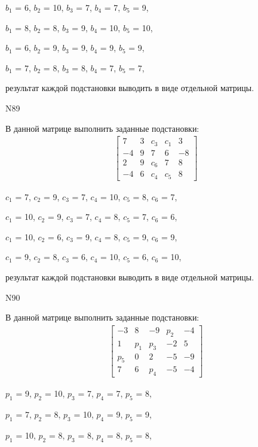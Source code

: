 \documentclass[11pt]{report}
\begin{document}
$b_{1}$ = 6, $b_{2}$ = 10, $b_{3}$ = 7, $b_{4}$ = 7, $b_{5}$ = 9, 

$b_{1}$ = 8, $b_{2}$ = 8, $b_{3}$ = 9, $b_{4}$ = 10, $b_{5}$ = 10, 

$b_{1}$ = 6, $b_{2}$ = 9, $b_{3}$ = 9, $b_{4}$ = 9, $b_{5}$ = 9, 

$b_{1}$ = 7, $b_{2}$ = 8, $b_{3}$ = 8, $b_{4}$ = 7, $b_{5}$ = 7, 

результат каждой подстановки выводить в виде отдельной матрицы.

N89

В данной матрице выполнить заданные подстановки:
\begin{align*}
\left[\begin{matrix}7 & 3 & c_{3} & c_{1} & 3\\-4 & 9 & 7 & 6 & -8\\2 & 9 & c_{6} & 7 & 8\\-4 & 6 & c_{4} & c_{5} & 8\end{matrix}\right]
\end{align*}


$c_{1}$ = 7, $c_{2}$ = 9, $c_{3}$ = 7, $c_{4}$ = 10, $c_{5}$ = 8, $c_{6}$ = 7, 

$c_{1}$ = 10, $c_{2}$ = 9, $c_{3}$ = 7, $c_{4}$ = 8, $c_{5}$ = 7, $c_{6}$ = 6, 

$c_{1}$ = 10, $c_{2}$ = 6, $c_{3}$ = 9, $c_{4}$ = 8, $c_{5}$ = 9, $c_{6}$ = 9, 

$c_{1}$ = 9, $c_{2}$ = 8, $c_{3}$ = 6, $c_{4}$ = 10, $c_{5}$ = 6, $c_{6}$ = 10, 

результат каждой подстановки выводить в виде отдельной матрицы.

N90

В данной матрице выполнить заданные подстановки:
\begin{align*}
\left[\begin{matrix}-3 & 8 & -9 & p_{2} & -4\\1 & p_{1} & p_{3} & -2 & 5\\p_{5} & 0 & 2 & -5 & -9\\7 & 6 & p_{4} & -5 & -4\end{matrix}\right]
\end{align*}


$p_{1}$ = 9, $p_{2}$ = 10, $p_{3}$ = 7, $p_{4}$ = 7, $p_{5}$ = 8, 

$p_{1}$ = 7, $p_{2}$ = 8, $p_{3}$ = 10, $p_{4}$ = 9, $p_{5}$ = 9, 

$p_{1}$ = 10, $p_{2}$ = 8, $p_{3}$ = 8, $p_{4}$ = 8, $p_{5}$ = 8, 
\end{document}
